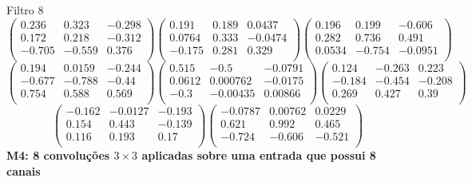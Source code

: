 Filtro 8
{ \small
\[
\begin{pmatrix}
  0.236 & 0.323 & -0.298 \\
  0.172 & 0.218 & -0.312 \\
  -0.705 & -0.559 & 0.376 \\
\end{pmatrix}
\begin{pmatrix}
  0.191 & 0.189 & 0.0437 \\
  0.0764 & 0.333 & -0.0474 \\
  -0.175 & 0.281 & 0.329 \\
\end{pmatrix}
\begin{pmatrix}
  0.196 & 0.199 & -0.606 \\
  0.282 & 0.736 & 0.491 \\
  0.0534 & -0.754 & -0.0951 \\
\end{pmatrix}
\]
\[
\begin{pmatrix}
  0.194 & 0.0159 & -0.244 \\
  -0.677 & -0.788 & -0.44 \\
  0.754 & 0.588 & 0.569 \\
\end{pmatrix}
\begin{pmatrix}
  0.515 & -0.5 & -0.0791 \\
  0.0612 & 0.000762 & -0.0175 \\
  -0.3 & -0.00435 & 0.00866 \\
\end{pmatrix}
\begin{pmatrix}
  0.124 & -0.263 & 0.223 \\
  -0.184 & -0.454 & -0.208 \\
  0.269 & 0.427 & 0.39 \\
\end{pmatrix}
\]
\[
\begin{pmatrix}
  -0.162 & -0.0127 & -0.193 \\
  0.154 & 0.443 & -0.139 \\
  0.116 & 0.193 & 0.17 \\
\end{pmatrix}
\begin{pmatrix}
  -0.0787 & 0.00762 & 0.0229 \\
  0.621 & 0.992 & 0.465 \\
  -0.724 & -0.606 & -0.521 \\
\end{pmatrix}
\]
}
\textbf{M4: 8 convoluções $3 \times 3$ aplicadas sobre uma entrada que 
possui 8 canais}

